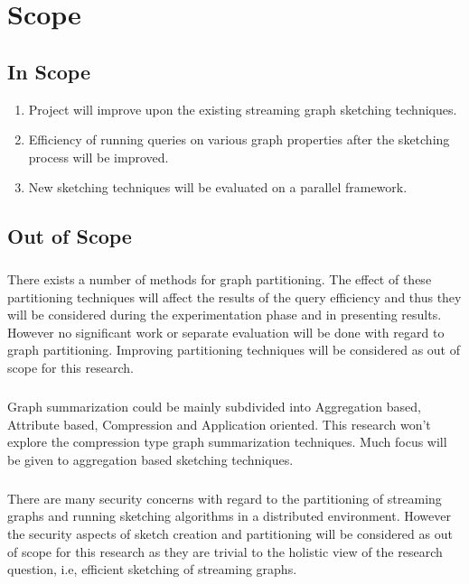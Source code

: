 \chapter{Scope}

\section{In Scope}

\begin{enumerate}
    \item Project will improve upon the existing streaming graph sketching techniques. 
    \item Efficiency of running queries on various graph properties after the sketching process will be improved.
    \item New sketching techniques will be evaluated on a parallel framework.
\end{enumerate}

\section{Out of Scope}

\paragraph{}
There exists a number of methods for graph partitioning. The effect of these 
partitioning techniques will affect the results of the query efficiency and 
thus they will be considered during the experimentation phase and in presenting 
results. However no significant work or separate evaluation will be done with 
regard to graph partitioning. Improving partitioning techniques will be 
considered as out of scope for this research. 

\paragraph{}
Graph summarization could be mainly subdivided into Aggregation based, 
Attribute based, Compression and Application oriented. This research won’t 
explore the compression type graph summarization techniques. Much focus will 
be given to aggregation based sketching techniques. 

\paragraph{}
There are many security concerns with regard to the partitioning of streaming 
graphs and running sketching algorithms in a distributed environment. However 
the security aspects of sketch creation and partitioning will be considered 
as out of scope for this research as they are trivial to the holistic view 
of the research question, i.e, efficient sketching of streaming graphs. 